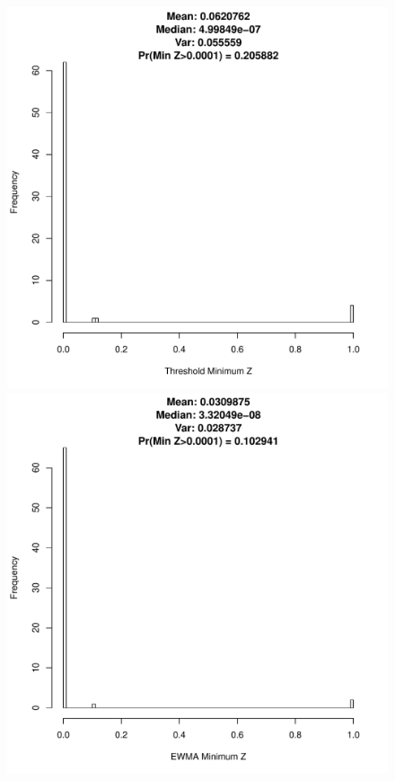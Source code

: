 \documentclass{article}
\begin{document}
%
\begin{figure}[h!]
        \begin{center}
                \begin{minipage}[h!]{0.32\textwidth}
                        \includegraphics[width=1.0\textwidth]{threshSimHistRast.pdf}
                \end{minipage}
                \begin{minipage}[h!]{0.32\textwidth}
                        \includegraphics[width=1.0\textwidth]{ewmaSimHistRast.pdf}

\end{minipage}
\end{center}
\end{figure}
\end{document}
